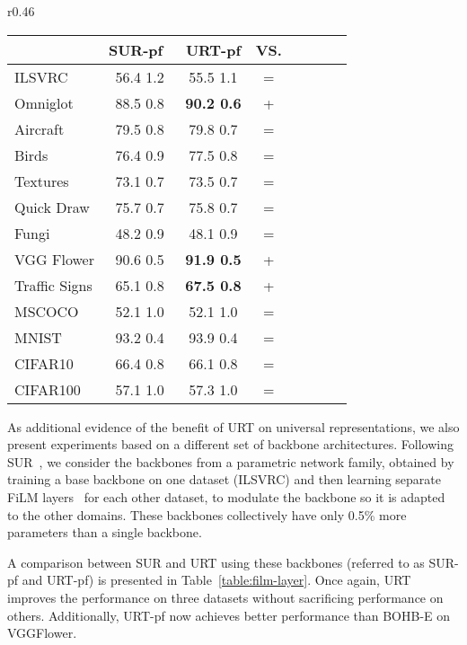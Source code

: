 \documentclass{article}
\begin{document}
\begin{wraptable}{r}{0.46\textwidth}
\vspace{-5mm}
\centering
\setlength{\tabcolsep}{2.5pt}
\caption{
Performance comparison using parametric network family (pf) backbones.}\label{table:film-layer}
\begin{tabular}{lcccccc|c}
\toprule
   & \textbf{SUR-pf}~\cite{dvornik2020selecting} & \textbf{URT-pf} & \textbf{VS.} \\
\midrule
ILSVRC &  56.4  1.2 &  55.5  1.1 & =  \\ 
Omniglot &  88.5  0.8 & \textbf{90.2  0.6} & +\\ 
Aircraft &   79.5  0.8  & 79.8  0.7 & = \\
Birds & 76.4  0.9 & 77.5  0.8 & = \\ 
Textures & 73.1  0.7  & 73.5  0.7& = \\
Quick Draw &  75.7  0.7 & 75.8  0.7 & =\\
Fungi & 48.2  0.9 & 48.1  0.9 & = \\
VGG Flower &  90.6  0.5 & \textbf{91.9  0.5} & + \\
\midrule
Traffic Signs & 65.1  0.8 & \textbf{67.5  0.8} & + \\
MSCOCO &  52.1  1.0 & 52.1  1.0 & = \\
MNIST & 93.2  0.4  & 93.9  0.4 & = \\
CIFAR10   & 66.4  0.8 & 66.1  0.8 & = \\
CIFAR100 & 57.1  1.0  & 57.3  1.0 & = \\
\bottomrule
\end{tabular}
\vspace{-4mm}
\end{wraptable}
As additional evidence of the benefit of URT on universal representations, we also present experiments based on a different set of backbone architectures. 
Following SUR~\cite{dvornik2020selecting}, we consider the backbones from a parametric network family, obtained by training a base backbone on one dataset (ILSVRC) and then learning separate FiLM layers~\cite{film2018} for each other dataset, to modulate the backbone so it is adapted to the other domains. These backbones collectively have only 0.5\% more parameters than a single backbone.



A comparison between SUR and URT using these backbones (referred to as SUR-pf and URT-pf) is presented in Table~\ref{table:film-layer}. Once again, URT improves the performance on three datasets without sacrificing performance on others. 
Additionally, URT-pf now achieves better performance than BOHB-E on VGGFlower.
\end{document}
